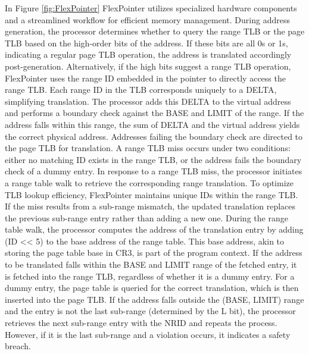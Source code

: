 In Figure \ref{fig:FlexPointer} FlexPointer utilizes specialized hardware components and a streamlined workflow for efficient memory management. During address generation, 
the processor determines whether to query the range TLB or the page TLB based on the high-order bits of the address. 
If these bits are all 0s or 1s, indicating a regular page TLB operation, the address is translated accordingly 
post-generation. Alternatively, if the high bits suggest a range TLB operation, FlexPointer uses the range ID 
embedded in the pointer to directly access the range TLB. Each range ID in the TLB corresponds uniquely to a 
DELTA, simplifying translation. The processor adds this DELTA to the virtual address and performs a boundary check 
against the BASE and LIMIT of the range. If the address falls within this range, the sum of DELTA and the 
virtual address yields the correct physical address. Addresses failing the boundary check are directed to the 
page TLB for translation.
\newline
A range TLB miss occurs under two conditions: either no matching ID exists in the range TLB, or the 
address fails the boundary check of a dummy entry. In response to a range TLB miss, the processor 
initiates a range table walk to retrieve the corresponding range translation. To optimize TLB lookup 
efficiency, FlexPointer maintains unique IDs within the range TLB. If the miss results from a sub-range mismatch, 
the updated translation replaces the previous sub-range entry rather than adding a new one. During the 
range table walk, the processor computes the address of the translation entry by adding (ID << 5) to the base address of the 
range table. This base address, akin to storing the page table base in CR3, is part of the program context. If the address to be 
translated falls within the BASE and LIMIT range of the fetched entry, it is fetched into the range TLB, regardless of whether 
it is a dummy entry. For a dummy entry, the page table is queried for the correct translation, which is then inserted 
into the page TLB. If the address falls outside the (BASE, LIMIT) range and the entry is not the last sub-range (determined by the L bit), the processor 
retrieves the next sub-range entry with the NRID and repeats the process. However, if it is the last sub-range and a violation occurs, it 
indicates a safety breach.

